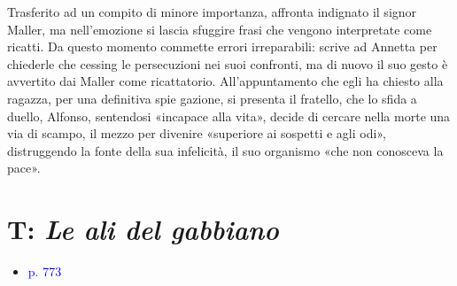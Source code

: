 \documentclass[a4paper, twoside, titlepage]{book}
\newcommand{\elenco}[1]{%
\begin{itemize}
#1
\end{itemize}}
\renewcommand{\emph}[1]{\textcolor{blue}{#1}}
\begin{document}
Trasferito ad un compito di minore importanza, affronta indignato il signor Maller, ma nell'emozione si lascia sfuggire frasi che vengono interpretate come ricatti. Da questo momento commette errori irreparabili: scrive ad Annetta per chiederle che cessing le persecuzioni nei suoi confronti, ma di nuovo il suo gesto è avvertito dai Maller come ricattatorio. All'appuntamento che egli ha chiesto alla ragazza, per una definitiva spie gazione, si presenta il fratello, che lo sfida a duello, Alfonso, sentendosi «incapace alla vita», decide di cercare nella morte una via di scampo, il mezzo per divenire «superiore ai sospetti e agli odi», distruggendo la fonte della sua infelicità, il suo organismo «che non conosceva la pace».

\section{T: \textit{Le ali del gabbiano}}
\elenco{\item \emph{p. 773}}
\end{document}
